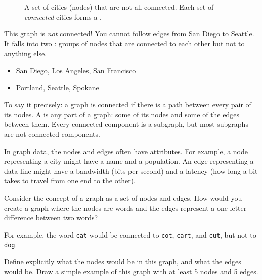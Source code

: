 \begin{figure}[H]
  \centering
  \caption{A set of cities (nodes) that are not all connected. Each set of \emph{connected} cities forms a .}
  \label{fig:notconnected}
\end{figure}

This graph is \textit{not} connected! You cannot follow edges from San
Diego to Seattle. It falls into two : groups of nodes that are
connected to each other but not to anything else.
\begin{itemize}
  \item San Diego, Los Angeles, San Francisco
  \item Portland, Seattle, Spokane
\end{itemize}

To say it precisely: a graph is connected if there is a path between
every pair of its nodes. A  is any part
of a graph: some of its nodes and some of the edges between them. Every
connected component is a subgraph, but most subgraphs are not connected
components.

In graph data, the nodes and edges often have attributes. For
example, a node representing a city might have a name and a
population. An edge representing a data line might have a bandwidth
(bits per second) and a latency (how long a bit takes to travel from one
end to the other).

\begin{Exercise}[title={Word Graphs}, label={ex:word_graph}]

  Consider the concept of a graph as a set of nodes and edges. How would you create a graph where the nodes are words and the edges represent a one letter difference between two words?

  For example, the word \texttt{cat} would be connected to \texttt{cot}, \texttt{cart}, and \texttt{cut}, but not to \texttt{dog}.

  Define explicitly what the nodes would be in this graph, and what the edges would be. Draw a simple example of this graph with at least 5 nodes and 5 edges.

\end{Exercise}

